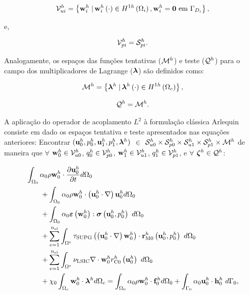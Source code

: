 \documentclass[tese_patricia]{subfiles}
\begin{document}
\begin{align}
	\mathcal{V}_{ui}^h = \left\{\mathbf{w}_{i}^{h} \left . \right| \mathbf{w}_{i}^{h} \left(\cdot\right) \in H^{1h}\left(\Omega_i\right), \mathbf{w}_{i}^{h} = \mathbf{0} \textrm { em} \ \Gamma_{D_i} \right\},
\end{align}

e,

\begin{align}
	\mathcal{V}_{pi}^h = \mathcal{S}_{pi}^h.
\end{align}

Analogamente, os espaços das funções tentativas ($\mathcal{M}^h$) e teste ($\mathcal{Q}^h$) para o campo dos multiplicadores de Lagrange ($\boldsymbol{\lambda}$) são definidos como:

\begin{align}
	\mathcal{M}^h = \left\{\boldsymbol{\lambda}^{h} \left . \right| \boldsymbol{\lambda}^{h} \left(\cdot\right) \in H^{1h}\left(\Omega_{c}\right) \right\},
\end{align}

\begin{align}
	\mathcal{Q}^h = \mathcal{M}^h.
\end{align}

A aplicação do operador de acoplamento $L^{2}$ à formulação clássica Arlequin consiste em dado os espaços tentativa e teste apresentados nas equações anteriores: Encontrar $(\mathbf{u}_0^h,p_0^h,\mathbf{u}_1^h,p_1^h,\boldsymbol{\lambda}^h)$ $\in$ $\mathcal{S}_{u0}^h \times \mathcal{S}_{p0}^h \times \mathcal{S}_{u1}^h \times \mathcal{S}_{p1}^h \times \mathcal{M}^h$ de maneira que  $\forall$ $\mathbf{w}_0^h \in \mathcal{V}_{u0}^h$, $q_0^h \in \mathcal{V}_{p0}^h$, $\mathbf{w}_1^h \in \mathcal{V}_{u1}^h$, $q_1^h \in \mathcal{V}_{p1}^h$, e $\forall$ $\boldsymbol{\zeta}^h \in \mathcal{Q}^h$:

\begin{align}
	\begin{split}
		&\int_{\domain_0} \arlequinWFGlobal \density \wglobalh \cdot \frac{\partial\uglobalh}{\partial t} d\domain_{0} \\ 
		&\qquad+
		\int_{\domain_0} \arlequinWFGlobal \density \wglobalh \cdot  \left(\uglobalh \cdot \nabla\right) \uglobalh d\domain_{0}  \\ 
		&\qquad+	
		\int_{\domain_{0}} \arlequinWFGlobal \straintensor \left(\wglobalh\right) : \stresstensor \left(\uglobalh,\pglobalh\right)\ d\domain_{0} 
		 \\ 
		&\qquad+ \sum_{e=1}^{\nel} \int_{\domainE} \SUPG  \left(\left(\uglobalh \cdot \nabla \right) \wglobalh\right) \cdot \resMomGlobal\left(\uglobalh,\pglobalh \right)\  d\domain_{0} \\ 
		&\qquad+\sum_{e=1}^{\nel} \int_{\domainE} \LSIC \nabla \cdot \wglobalh \resPreGlobal 
		 \left(\uglobalh\right)\  d\domain_{0} \\
		 &\qquad+ \chi_{0} \int_{\domain_c} \wglobalh \cdot \lagrangeMultiplier^{h} d\domain_{c}  = \int_{\domain_0} \arlequinWFGlobal \density \wglobalh \cdot  \sbodyforce_{0}^{h} d\domain_{0} + \int_{\boundary_{0}} \arlequinWFGlobal \uglobalh \cdot \straction_{0}^{h}\ d\boundary_{0},
		\label{eq:FinalSystem0}
	\end{split}
\end{align}
\end{document}
